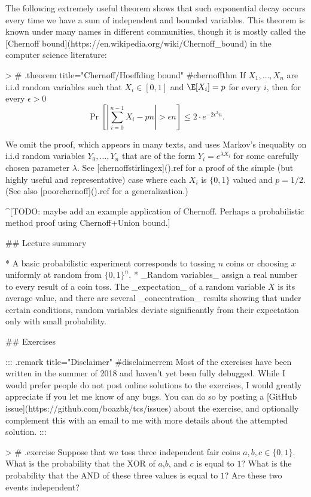 The following extremely useful theorem shows that such exponential decay occurs every time we have a sum of independent and bounded variables. This theorem is known under many names in different communities, though it is mostly called the [Chernoff bound](https://en.wikipedia.org/wiki/Chernoff_bound) in the computer science literature:



> # {.theorem title="Chernoff/Hoeffding bound" #chernoffthm}
If $X_1,\ldots,X_n$ are i.i.d random variables such that $X_i \in [0,1]$ and $\E[X_i]=p$ for every $i$,
then for every $\epsilon >0$
$$
\Pr[ \left| \sum_{i=0}^{n-1} X_i - pn \right| > \epsilon n ] \leq 2\cdot e^{-2\epsilon^2 n} .
$$

We omit the proof, which appears in many texts, and uses Markov's inequality on i.i.d random variables $Y_0,\ldots,Y_n$ that are of the form $Y_i = e^{\lambda X_i}$ for some carefully chosen parameter $\lambda$.
See [chernoffstirlingex](){.ref}  for a proof of the    simple (but highly useful and representative) case where each $X_i$ is $\{0,1\}$ valued and $p=1/2$.
(See also [poorchernoff](){.ref} for a generalization.)

^[TODO: maybe add an example application of Chernoff. Perhaps a probabilistic method proof using Chernoff+Union bound.]

## Lecture summary

* A basic probabilistic experiment corresponds to tossing $n$ coins or choosing $x$ uniformly at random from $\{0,1\}^n$.
* _Random variables_ assign a real number to every result of a coin toss. The _expectation_ of a random variable $X$ is its average value, and there are several _concentration_ results showing that under certain conditions,  random variables deviate significantly from their expectation only with small probability.

## Exercises

::: {.remark title="Disclaimer" #disclaimerrem}
Most of the exercises have been written in the summer of 2018 and haven't yet been fully debugged. While I would prefer people do not post online solutions to the exercises, I would greatly appreciate if you let me know of any bugs. You can do so by posting a [GitHub issue](https://github.com/boazbk/tcs/issues) about the exercise, and optionally complement this with an email to me with more details about the attempted solution.
:::


> # {.exercise }
Suppose that we toss three independent fair coins $a,b,c \in \{0,1\}$. What is the probability that the XOR of $a$,$b$, and $c$ is equal to $1$? What is the probability that the AND of these three values is equal to $1$? Are these two events independent?


